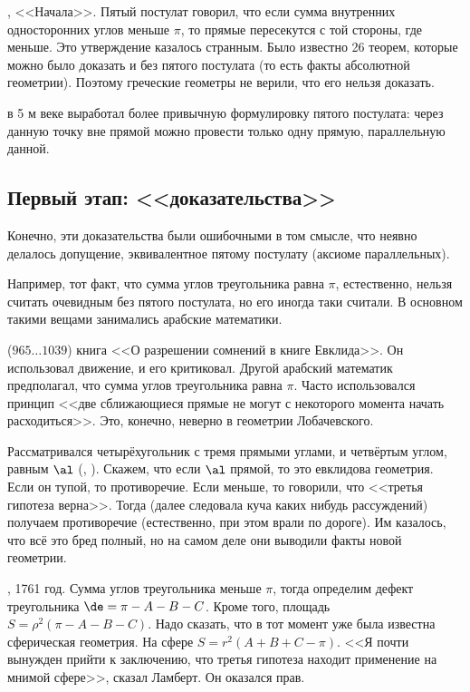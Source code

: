 \documentclass[a4paper,oneside,fleqn,10pt]{article}
\newcommand{\pe}[2]{${#1}\ldots{#2}$}
\begin{document}
, <<Начала>>. Пятый постулат говорил, что если сумма внутренних односторонних
углов меньше $\pi$, то прямые пересекутся с той стороны, где меньше.
Это утверждение казалось странным. Было известно 26 теорем,
которые можно было доказать и без пятого постулата (то есть факты абсолютной геометрии).
Поэтому греческие геометры не верили, что его нельзя доказать.

 в 5 м веке выработал более привычную формулировку пятого постулата:
через данную точку вне прямой можно провести только одну прямую, параллельную данной.

\subsection{Первый этап: <<доказательства>>}

Конечно, эти доказательства были ошибочными в том смысле, что неявно делалось
допущение, эквивалентное пятому постулату (аксиоме параллельных).

Например, тот факт, что сумма углов треугольника равна $\pi$, естественно,
нельзя считать очевидным без пятого постулата, но его иногда таки считали.
В основном такими вещами занимались арабские математики.

 (\pe{965}{1039}) книга <<О разрешении сомнений в книге Евклида>>.
Он использовал движение, и  его критиковал.
Другой арабский математик  предполагал, что сумма углов треугольника равна $\pi$.
Часто использовался принцип <<две сближающиеся прямые не могут
с некоторого момента начать расходиться>>. Это, конечно, неверно
в геометрии Лобачевского.

Рассматривался четырёхугольник с тремя прямыми углами, и четвёртым углом, равным $\al$ (, ).
Скажем, что если $\al$ прямой, то это евклидова геометрия.
Если он тупой, то противоречие. Если меньше, то говорили, что <<третья гипотеза верна>>.
Тогда (далее следовала куча каких нибудь рассуждений) получаем противоречие
(естественно, при этом врали по дороге).
Им казалось, что всё это бред полный, но на самом деле они выводили
факты новой геометрии.

, 1761 год. Сумма углов треугольника меньше $\pi$, тогда определим дефект
треугольника $\de = \pi - A - B - C$. Кроме того, площадь $S = \rho^2(\pi - A - B - C)$.
Надо сказать, что в тот момент уже была известна сферическая геометрия. На сфере $S = r^2(A + B + C - \pi)$.
<<Я почти вынужден прийти к заключению, что третья гипотеза находит применение на мнимой
сфере>>, сказал Ламберт. Он оказался прав.
\end{document}
